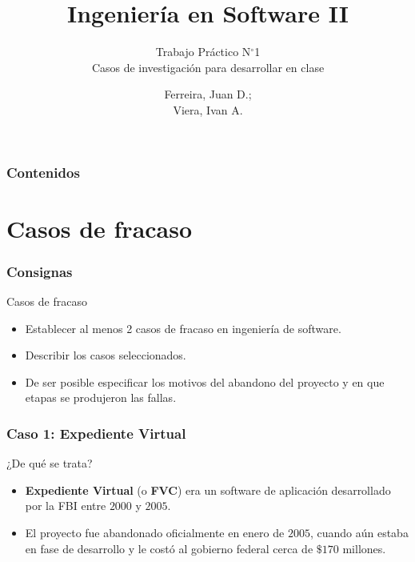 \documentclass[11pt]{beamer}
\title{Ingeniería en Software II}
\subtitle[TPN1]{Trabajo Práctico N$^{\circ}$1\\ 
	Casos de investigación para desarrollar en clase}
\author{Ferreira, Juan D.;\\ %
	    Viera, Ivan A.      %
}
\begin{document}
	
	\begin{frame} %
		\titlepage
	\end{frame}

	\begin{frame}
		\frametitle{Contenidos}
		\tableofcontents[pausesections]
	\end{frame}

	\section[Casos de fracaso]{Casos de fracaso}
	\begin{frame}
		\frametitle{Consignas}
		\begin{exampleblock}{Casos de fracaso}
			\begin{itemize}
				\item Establecer al menos 2 casos de fracaso en ingeniería de software.
				\item Describir los casos seleccionados.
				\item De ser posible especificar los motivos del abandono del proyecto y en que etapas se produjeron
				las fallas.
			\end{itemize}
		\end{exampleblock}
	\end{frame}

	\begin{frame}
		\frametitle{Caso 1: Expediente Virtual}
		\begin{block}{¿De qué se trata?}
			\begin{itemize}
				\item \textbf{Expediente Virtual} (o \textbf{FVC}) era un software de aplicación desarrollado por la FBI entre $2000$ y $2005$.
				\pause
				\item El proyecto fue abandonado oficialmente en enero de $2005$, cuando aún estaba en fase de desarrollo y le costó al gobierno federal cerca de $\$170$ millones.
			\end{itemize}
		\end{block}
	\end{frame}
\end{document}

